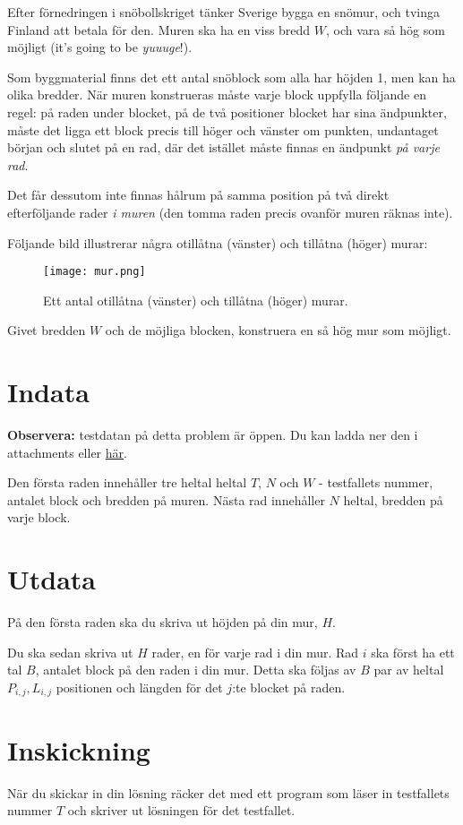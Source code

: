 Efter förnedringen i snöbollskriget tänker Sverige bygga en snömur, och tvinga Finland att betala för den.
Muren ska ha en viss bredd $W$, och vara så hög som möjligt (it's going to be \emph{yuuuge}!).

Som byggmaterial finns det ett antal snöblock som alla har höjden 1, men kan ha olika bredder.
När muren konstrueras måste varje block uppfylla följande en regel: på raden under blocket,
på de två positioner blocket har sina ändpunkter, måste det ligga ett block precis till höger och vänster om punkten,
undantaget början och slutet på en rad, där det istället måste finnas en ändpunkt \emph{på varje rad}.

Det får dessutom inte finnas hålrum på samma position på två direkt efterföljande rader \emph{i muren} (den tomma raden
precis ovanför muren räknas inte).

Följande bild illustrerar några otillåtna (vänster) och tillåtna (höger) murar:

\begin{figure}[h]
	\centering
	\texttt{[image: mur.png]}
	\caption{Ett antal otillåtna (vänster) och tillåtna (höger) murar.}
\end{figure}

Givet bredden $W$ och de möjliga blocken, konstruera en så hög mur som möjligt.

\section*{Indata}
\textbf{Observera:} testdatan på detta problem är öppen. Du kan ladda ner den i attachments eller \href{https://progolymp.se/uploads/snomur.zip}{här}.

\noindent
Den första raden innehåller tre heltal heltal $T$, $N$ och $W$ - testfallets nummer, antalet block och bredden på muren.
Nästa rad innehåller $N$ heltal, bredden på varje block.

\section*{Utdata}
På den första raden ska du skriva ut höjden på din mur, $H$.

Du ska sedan skriva ut $H$ rader, en för varje rad i din mur.
Rad $i$ ska först ha ett tal $B$, antalet block på den raden i din mur.
Detta ska följas av $B$ par av heltal $P_{i,j}, L_{i,j}$ positionen och längden för det $j$:te blocket på raden.

\section*{Inskickning}
När du skickar in din lösning räcker det med ett program som läser in testfallets nummer $T$ och skriver ut lösningen för det testfallet.


